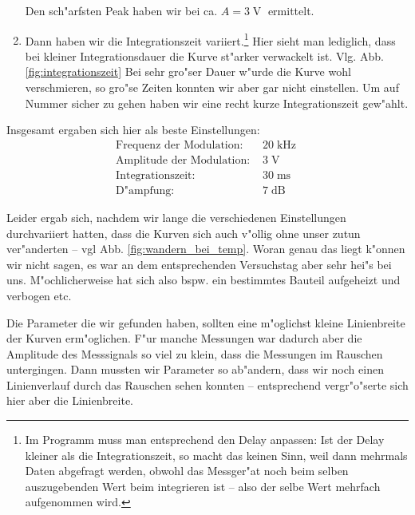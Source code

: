 \documentclass[a4paper,12pt]{article}
\begin{document}
\begin{enumerate}
Den sch"arfsten Peak haben wir bei ca. $A = 3\operatorname{V}$
ermittelt.
\item Dann haben wir die Integrationszeit variiert.\footnote{Im
    Programm muss man entsprechend den Delay anpassen: Ist der Delay
    kleiner als die Integrationszeit, so macht das keinen Sinn, weil
    dann mehrmals Daten abgefragt werden, obwohl das Messger"at noch
    beim selben auszugebenden Wert beim integrieren ist -- also der
    selbe Wert mehrfach aufgenommen wird.} Hier sieht man lediglich,
  dass bei kleiner Integrationsdauer die Kurve st"arker verwackelt
  ist. Vlg. Abb. \ref{fig:integrationszeit} Bei sehr gro"ser Dauer
  w"urde die Kurve wohl verschmieren, so gro"se Zeiten konnten wir
  aber gar nicht einstellen. Um auf Nummer sicher zu gehen haben wir
  eine recht kurze Integrationszeit gew"ahlt.
\end{enumerate}

Insgesamt ergaben sich hier als beste Einstellungen:
\begin{eqnarray*}
  \text{Frequenz der Modulation: } & 20\operatorname{kHz}\\
  \text{Amplitude der Modulation: } & 3\operatorname{V}\\
  \text{Integrationszeit: } & 30\operatorname{ms}\\
  \text{D"ampfung: } & 7\operatorname{dB}
\end{eqnarray*}



Leider ergab sich, nachdem wir lange die verschiedenen Einstellungen
durchvariiert hatten, dass die Kurven sich auch v"ollig ohne unser
zutun ver"anderten -- vgl Abb. \ref{fig:wandern_bei_temp}. Woran genau
das liegt k"onnen wir nicht sagen, es war an dem entsprechenden
Versuchstag aber sehr hei"s bei uns. M"ochlicherweise hat sich also
bspw. ein bestimmtes Bauteil aufgeheizt und verbogen etc. 


Die Parameter die wir gefunden haben, sollten eine m"oglichst kleine
Linienbreite der Kurven erm"oglichen. F"ur manche Messungen war
dadurch aber die Amplitude des Messsignals so viel zu klein, dass die
Messungen im Rauschen untergingen. Dann mussten wir Parameter so
ab"andern, dass wir noch einen Linienverlauf durch das Rauschen sehen
konnten -- entsprechend vergr"o"serte sich hier aber die Linienbreite.
\end{document}
